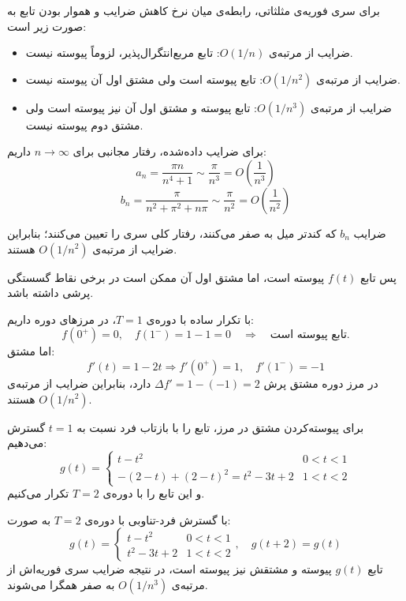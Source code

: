 
برای سری فوریه‌ی مثلثاتی، رابطه‌ی میان نرخ کاهش ضرایب و هموار بودن تابع به صورت زیر است:
\begin{itemize}
  \item ضرایب از مرتبه‌ی $O(1/n)$: تابع مربع‌انتگرال‌پذیر، لزوماً پیوسته نیست.
  \item ضرایب از مرتبه‌ی $O(1/n^2)$: تابع پیوسته است ولی مشتق اول آن پیوسته نیست.
  \item ضرایب از مرتبه‌ی $O(1/n^3)$: تابع پیوسته و مشتق اول آن نیز پیوسته است ولی مشتق دوم پیوسته نیست.
\end{itemize}

برای ضرایب داده‌شده، رفتار مجانبی برای $n\to\infty$ داریم:
$$a_n = \frac{\pi n}{n^4+1} \sim \frac{\pi}{n^3} = O\!\left(\frac{1}{n^3}\right)$$
$$b_n = \frac{\pi}{n^2+\pi^2+n\pi} \sim \frac{\pi}{n^2} = O\!\left(\frac{1}{n^2}\right)$$

ضرایب $b_n$ که کندتر میل به صفر می‌کنند، رفتار کلی سری را تعیین می‌کنند؛ بنابراین ضرایب از مرتبه‌ی $O(1/n^2)$ هستند.

\medskip
پس تابع $f(t)$ {پیوسته} است، اما مشتق اول آن ممکن است در برخی نقاط گسستگی پرشی داشته باشد.


با تکرار ساده با دوره‌ی $T=1$، در مرزهای دوره داریم:
$$f(0^+) = 0,\quad f(1^-) = 1-1 = 0 \quad\Rightarrow\quad \text{تابع پیوسته است.}$$
اما مشتق:
$$f'(t)=1-2t \Rightarrow f'(0^+)=1,\quad f'(1^-)=-1$$
در مرز دوره مشتق پرش $\Delta f' = 1-(-1)=2$ دارد، بنابراین ضرایب از مرتبه‌ی $O(1/n^2)$ هستند.

برای پیوسته‌کردن مشتق در مرز، تابع را با بازتاب فرد نسبت به $t=1$ گسترش می‌دهیم:
$$g(t) = \begin{cases} t - t^2 & 0 < t < 1 \\ -(2-t) + (2-t)^2 = t^2 - 3t + 2 & 1 < t < 2 \end{cases}$$
و این تابع را با دوره‌ی $T=2$ تکرار می‌کنیم.

با گسترش فرد-تناوبی با دوره‌ی $T=2$ به صورت:
$$\boxed{g(t) = \begin{cases} t-t^2 & 0 < t < 1 \\ t^2-3t+2 & 1 < t < 2 \end{cases}, \quad g(t+2)=g(t)}$$
تابع $g(t)$ پیوسته و مشتقش نیز پیوسته است، در نتیجه ضرایب سری فوریه‌اش از مرتبه‌ی $O(1/n^3)$ به صفر همگرا می‌شوند.
